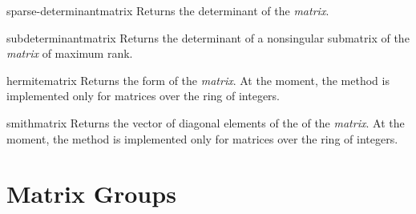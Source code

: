 \begin{functiondef}{sparse-determinant}{matrix}
Returns the determinant of the {\em matrix}.
\end{functiondef}
  
\begin{functiondef}{subdeterminant}{matrix}
Returns the determinant of a nonsingular submatrix of the {\em matrix}
of maximum rank.
\end{functiondef}
  
\begin{functiondef}{hermite}{matrix}
Returns the  form of the {\em matrix}.
At the moment, the method is implemented only for matrices
over the ring of integers.
\end{functiondef}
  
\begin{functiondef}{smith}{matrix}
Returns the vector of diagonal elements of the  of the {\em matrix}.  At the moment, the method is implemented
only for matrices over the ring of integers.
\end{functiondef}
  
\section{Matrix Groups}





